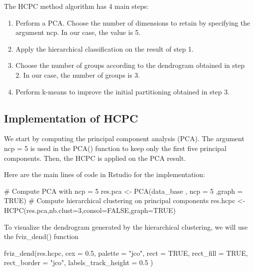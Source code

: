\documentclass[12pt]{article}
\begin{document}
\vspace{0.2 cm}

The HCPC method algorithm has 4 main steps:

\begin{enumerate}
    \item  Perform a PCA. Choose the number of dimensions to retain by specifying the argument ncp. In our case, the value is 5.
    \item Apply the hierarchical classification on the result of step 1.
    \item Choose the number of groups according to the dendrogram obtained in step 2. In our case, the number of groups is 3.
    \item Perform k-means to improve the initial partitioning obtained in step 3.
\end{enumerate}


\subsection{Implementation  of HCPC}

We start by computing the principal component analysis (PCA). The argument ncp = 5 is used in the PCA() function to keep only the first five principal components. Then, the HCPC is applied on the PCA result.

Here are the main lines of code in Rstudio for the implementation:

\begin{customFrame}
# Compute PCA with ncp = 5
res.pca <- PCA(data_base , ncp = 5 ,graph = TRUE)
# Compute hierarchical clustering on principal components
res.hcpc <- HCPC(res.pca,nb.clust=3,consol=FALSE,graph=TRUE)
\end{customFrame}


To visualize the dendrogram generated by the hierarchical clustering, we will use the fviz\_dend() function

\begin{customFrame}
fviz_dend(res.hcpc, 
          cex = 0.5,                    
          palette = "jco",               
          rect = TRUE, rect_fill = TRUE, 
          rect_border = "jco",           
          labels_track_height = 0.5 )
\end{customFrame}
\end{document}
